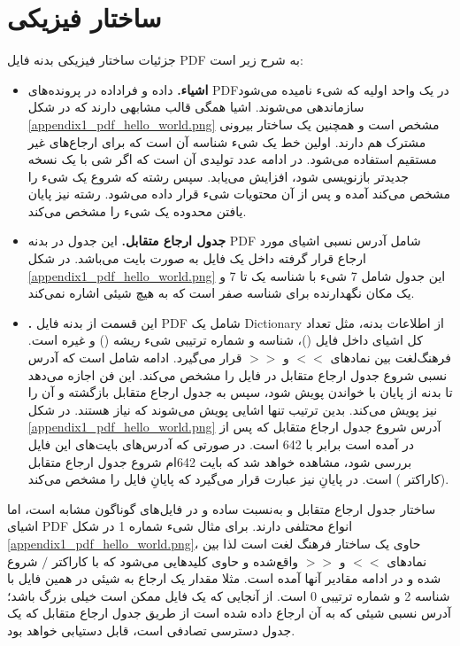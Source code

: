\section{ساختار فیزیکی}\label{sec:physical_structure}
جزئیات ساختار فیزیکی بدنه فایل \gls*{PDF} به شرح زیر است:
\begin{itemize}
	\item{
		\textbf{اشیاء.}	
داده و فراداده در پرونده‌های \gls*{PDF}در یک واحد اولیه که شیء نامیده می‌شود سازماندهی می‌شوند. اشیا همگی قالب مشابهی دارند که در شکل \ref{appendix1_pdf_hello_world.png} مشخص است و همچنین یک ساختار بیرونی مشترک هم دارند. اولین خط یک شیء شناسه آن است که برای ارجاع‌های غیر مستقیم استفاده می‌شود. در ادامه عدد تولیدی آن است که اگر شی با یک نسخه جدیدتر بازنویسی شود، افزایش می‌یابد. سپس رشته 
\texttt{}
 که شروع یک شیء را مشخص می‌کند آمده و پس از آن محتویات شیء قرار داده می‌شود. رشته 
 \texttt{}
 نیز پایان یافتن محدوده یک شیء را مشخص می‌کند.
	}

	\item{
		\textbf{جدول ارجاع متقابل.}	
	این جدول در بدنه \gls*{PDF} شامل آدرس نسبی اشیای مورد ارجاع قرار گرفته داخل یک فایل به صورت بایت می‌باشد. در شکل \ref{appendix1_pdf_hello_world.png} این جدول شامل 7 شیء با شناسه یک تا 7 و یک مکان نگهدارنده برای شناسه صفر است که به هیچ شیئی اشاره نمی‌کند.
	
	
	}

	\item{
		\textbf{.}	
	 این قسمت از بدنه فایل \gls*{PDF} شامل یک \gls{Dictionary} از اطلاعات بدنه، مثل تعداد کل اشیای داخل فایل 
	 (\texttt{})، شناسه و شماره ترتیبی شیء ریشه 
     (\texttt{})
	 و غیره است. فرهنگ‌لغت بین نمادهای $ << $  و  $ >> $ قرار می‌گیرد. ادامه  شامل  است که آدرس نسبی شروع جدول ارجاع متقابل در فایل را مشخص می‌کند. این فن اجازه می‌دهد تا بدنه از پایان با خواندن  پویش شود، سپس به جدول ارجاع متقابل بازگشته و آن را نیز پویش می‌کند. بدین ترتیب تنها اشایی پویش می‌شوند که نیاز هستند. در شکل \ref{appendix1_pdf_hello_world.png} آدرس شروع جدول ارجاع متقابل که پس از  در  آمده است برابر با 642 است. در صورتی که آدرس‌‌های بایت‌های این فایل بررسی شود، مشاهده خواهد شد که بایت 642ام شروع جدول ارجاع متقابل (کاراکتر \texttt{}) است. در پایانِ  نیز عبارت 
	 \texttt{}
	 قرار می‌گیرد که پایانِ فایل را مشخص می‌کند.
	
	}
\end{itemize}


ساختار جدول ارجاع متقابل و  به‌نسبت ساده و در فایل‌های گوناگون مشابه است، اما اشیای \gls{PDF}
 انواع محتلفی دارند. برای مثال شیء شماره 1 در شکل \ref{appendix1_pdf_hello_world.png}، حاوی یک ساختار فرهنگ ‌لغت است لذا بین نمادهای $ << $  و  $ >> $  واقع‌شده و حاوی کلیدهایی می‌شود که با کاراکتر $/$ شروع شده و در ادامه مقادیر آنها آمده است. مثلا مقدار 
\texttt{}
 یک ارجاع به شیئی در همین فایل با شناسه 2 و شماره ترتیبی 0 است. از آنجایی که یک فایل ممکن است خیلی بزرگ باشد؛ آدرس نسبی شیئی که به آن ارجاع داده شده است از طریق جدول ارجاع متقابل که یک جدول دسترسی تصادفی است، قابل دستیابی خواهد بود.
 
